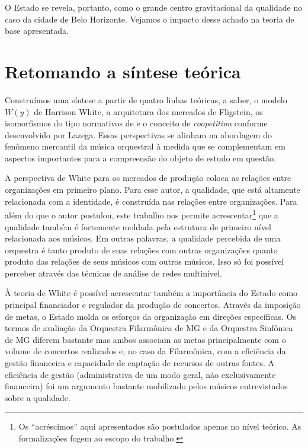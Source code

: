 \documentclass[a4paper, 12pt, openright, oneside, german, french, english, brazil]{abntex2}
\begin{document}
        O Estado se revela, portanto, como o grande centro gravitacional da qualidade no caso da cidade de Belo Horizonte. Vejamos o impacto desse achado na teoria de base apresentada.

        

        \section{Retomando a síntese teórica}
        
        Construímos uma síntese a partir de quatro linhas teóricas, a saber, o modelo $W(y)$ de Harrison White, a arquitetura dos mercados de Fligstein, os isomorfismos do tipo normativos de  e o conceito de \textit{coopetition} conforme desenvolvido por Lazega. Essas perspectivas se alinham na abordagem do fenômeno mercantil da música orquestral à medida que se complementam em aspectos importantes para a compreensão do objeto de estudo em questão.

        A perspectiva de White para os mercados de produção coloca as relações entre organizações em primeiro plano. Para esse autor, a qualidade, que está altamente relacionada com a identidade, é construída nas relações entre organizações. Para além do que o autor postulou, este trabalho nos permite acrescentar\footnote{Os ``acréscimos'' aqui apresentados são postulados apenas no nível teórico. As formalizações fogem ao escopo do trabalho.} que a qualidade também é fortemente moldada pela estrutura de primeiro nível relacionada aos músicos. Em outras palavras, a qualidade percebida de uma orquestra é tanto produto de suas relações com outras organizações quanto produto das relações de seus músicos com outros músicos. Isso só foi possível perceber através das técnicas de análise de redes multinível.
	
	À teoria de White é possível acrescentar também a importância do Estado como principal financiador e regulador da produção de concertos. Através da imposição de metas, o Estado molda os esforços da organização em direções específicas. Os termos de avaliação da Orquestra Filarmônica de MG e da Orquestra Sinfônica de MG diferem bastante mas ambos associam as metas principalmente com o volume de concertos realizados e, no caso da Filarmônica, com a eficiência da gestão financeira e capacidade de captação de recursos de outras fontes. A eficiência de gestão (administrativa de um modo geral, não exclusivamente financeira) foi um argumento bastante mobilizado pelos músicos entrevistados sobre a qualidade.
	
\end{document}
